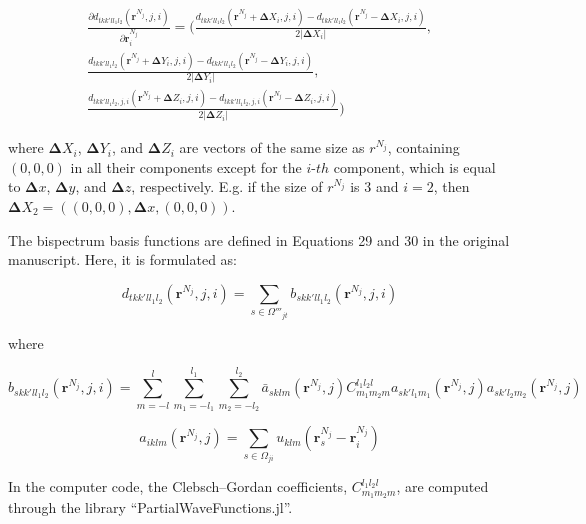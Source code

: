 \documentclass[12pt]{article}
\begin{document}
\begin{equation}
\begin{split}
     \frac{\partial d_{tkk'l{l_1}{l_2}}(\bm r^{N_j}, j, i)}{\partial \bm r^{N_j}_i} =  
 \bigg( \frac{ d_{tkk'l{l_1}{l_2}}(\bm r^{N_j} + \bm \Delta X_i, j, i) - d_{tkk'l{l_1}{l_2}}(\bm r^{N_j} - \bm \Delta X_i, j, i) } {2 |\bm \Delta X_i|}, \\
          \frac{ d_{tkk'l{l_1}{l_2}}(\bm r^{N_j} + \bm \Delta Y_i, j, i) - d_{tkk'l{l_1}{l_2}}(\bm r^{N_j} - \bm \Delta Y_i, j, i) } {2 |\bm \Delta Y_i|},\\
          \frac{ d_{tkk'l{l_1}{l_2}, j, i}(\bm r^{N_j} + \bm \Delta Z_i, j, i) - d_{tkk'l{l_1}{l_2}, j, i}(\bm r^{N_j} - \bm \Delta Z_i, j, i) } {2 |\bm \Delta Z_i|} \bigg)
\end{split}
\end{equation}

where $\bm \Delta X_i$, $\bm \Delta Y_i$, and $\bm \Delta Z_i$ are vectors of the same size as $r^{N_j}$, containing $(0,0,0)$ in all their components except for the $i$-$th$ component, which is equal to $\bm \Delta x$, $\bm \Delta y$, and $\bm \Delta z$, respectively. E.g. if the size of $r^{N_j}$ is $3$ and $i = 2$, then $\bm \Delta X_2 = ( (0,0,0), \bm \Delta x, (0,0,0))$.

The bispectrum basis functions are defined in Equations 29 and 30 in the original manuscript. Here, it is formulated as:

\begin{equation}
    \label{eq:derd}
    d_{tkk'l{l_1}{l_2}}(\bm r^{N_j}, j, i) = \sum_{s \in \Omega'''_{jt}} b_{skk'l{l_1}{l_2}}(\bm r^{N_j}, j, i)
\end{equation}

where 

\begin{equation}
    b_{skk'l{l_1}{l_2}}(\bm r^{N_j}, j, i) = 
     \sum_{m=-l}^l
     \sum_{m_1=-{l_1}}^{l_1}
     \sum_{m_2=-l_2}^{l_2}
     \bar{a}_{sklm}(\bm r^{N_j}, j)
     C_{{m_1}{m_2}m}^{{l_1}{l_2}l}
     a_{sk'{l_1}{m_1}}(\bm r^{N_j}, j)
     a_{sk'{l_2}{m_2}}(\bm r^{N_j}, j)
\end{equation}

\begin{equation}
    a_{iklm}(\bm r^{N_j}, j) = \sum_{s \in \Omega_{ji}} u_{klm}(\bm r^{N_j}_s -\bm r^{N_j}_i)
\end{equation}


In the computer code, the Clebsch–Gordan coefficients, $C_{{m_1}{m_2}m}^{{l_1}{l_2}l}$, are computed through the library ``PartialWaveFunctions.jl''.
\end{document}
